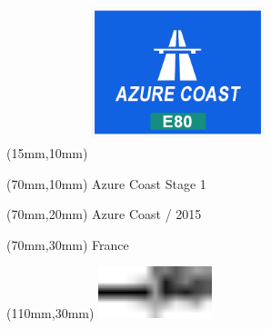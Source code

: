 \null\newpage
\begin{textblock*}{50mm}(15mm,10mm)%
\includegraphics[width=50mm]{LG/AZO.png}
\end{textblock*}
\begin{textblock*}{130mm}(70mm,10mm)%
{\fontsize{20}{20}\selectfont Azure Coast Stage 1}\\
\end{textblock*}
\begin{textblock*}{120mm}(70mm,20mm)%
{\fontsize{16}{16}\selectfont Azure Coast / 2015}\\
\end{textblock*}
\begin{textblock*}{120mm}(70mm,30mm)%
{\fontsize{12}{12}\selectfont France}
\end{textblock*}
\begin{textblock*}{30mm}(110mm,30mm)%
\centering
\includegraphics[height=15mm]{icons/tofinish.pdf}
\end{textblock*}
